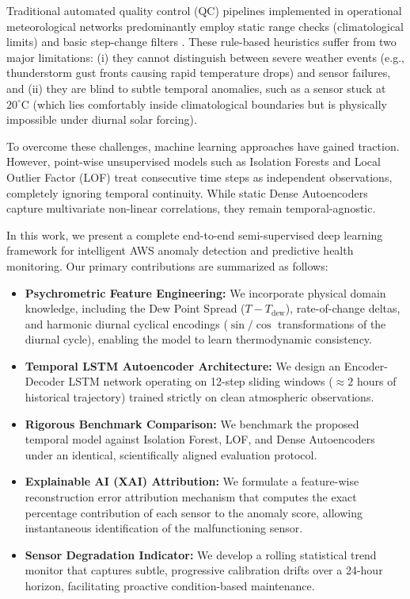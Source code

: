 \documentclass[conference]{IEEEtran}
\begin{document}
Traditional automated quality control (QC) pipelines implemented in operational meteorological networks predominantly employ static range checks (climatological limits) and basic step-change filters \cite{wmo2018guide}. These rule-based heuristics suffer from two major limitations: (i) they cannot distinguish between severe weather events (e.g., thunderstorm gust fronts causing rapid temperature drops) and sensor failures, and (ii) they are blind to subtle temporal anomalies, such as a sensor stuck at $20^\circ\text{C}$ (which lies comfortably inside climatological boundaries but is physically impossible under diurnal solar forcing).

To overcome these challenges, machine learning approaches have gained traction. However, point-wise unsupervised models such as Isolation Forests \cite{liu2008isolation} and Local Outlier Factor (LOF) \cite{breunig2000lof} treat consecutive time steps as independent observations, completely ignoring temporal continuity. While static Dense Autoencoders \cite{sakurada2014anomaly} capture multivariate non-linear correlations, they remain temporal-agnostic.

In this work, we present a complete end-to-end semi-supervised deep learning framework for intelligent AWS anomaly detection and predictive health monitoring. Our primary contributions are summarized as follows:
\begin{itemize}
    \item \textbf{Psychrometric Feature Engineering:} We incorporate physical domain knowledge, including the Dew Point Spread ($T - T_{\text{dew}}$), rate-of-change deltas, and harmonic diurnal cyclical encodings ($\sin/\cos$ transformations of the diurnal cycle), enabling the model to learn thermodynamic consistency.
    \item \textbf{Temporal LSTM Autoencoder Architecture:} We design an Encoder-Decoder LSTM network operating on 12-step sliding windows ($\approx 2$ hours of historical trajectory) trained strictly on clean atmospheric observations.
    \item \textbf{Rigorous Benchmark Comparison:} We benchmark the proposed temporal model against Isolation Forest, LOF, and Dense Autoencoders under an identical, scientifically aligned evaluation protocol.
    \item \textbf{Explainable AI (XAI) Attribution:} We formulate a feature-wise reconstruction error attribution mechanism that computes the exact percentage contribution of each sensor to the anomaly score, allowing instantaneous identification of the malfunctioning sensor.
    \item \textbf{Sensor Degradation Indicator:} We develop a rolling statistical trend monitor that captures subtle, progressive calibration drifts over a 24-hour horizon, facilitating proactive condition-based maintenance.
\end{itemize}
\end{document}

